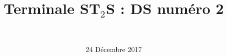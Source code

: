 \documentclass[a4paper,12pt]{exam}
\author{\ }
\date{24 Décembre 2017}
\title{Terminale ST$_2$S : DS num\'ero 2}
\begin{document}
%	

	
	

\ 
\ 
\\

\newpage






\newpage



\newpage
	


\appendix

\label{annexe}
	\label{LastPage}
	
\end{document}
